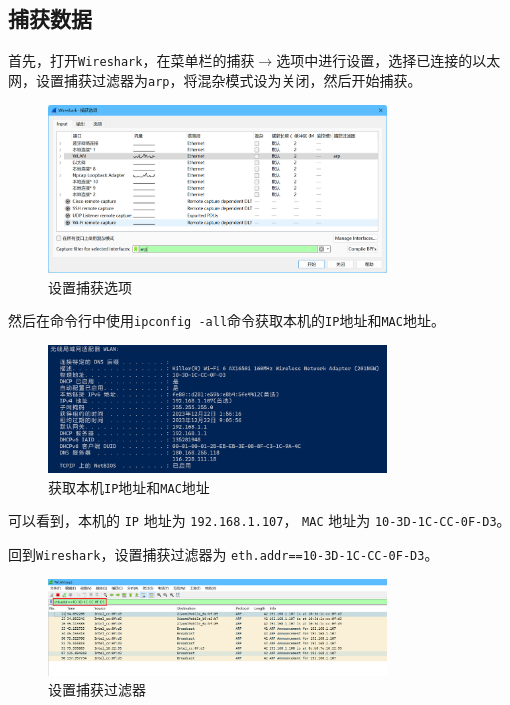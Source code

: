 \documentclass{article}
\begin{document}
\subsection{捕获数据}

首先，打开\texttt{Wireshark}，在菜单栏的捕获\(\to \)选项中进行设置，选择已连接的以太网，设置捕获过滤器为\texttt{arp}，将混杂模式设为关闭，然后开始捕获。

\begin{figure}[H]
  \centering
  \includegraphics[width=0.8\textwidth]{img/1.png}
  \caption{设置捕获选项}
  \label{fig:1}
\end{figure}

然后在命令行中使用\texttt{ipconfig -all}命令获取本机的\texttt{IP}地址和\texttt{MAC}地址。

\begin{figure}[H]
  \centering
  \includegraphics[width=0.8\textwidth]{img/2.png}
  \caption{获取本机\texttt{IP}地址和\texttt{MAC}地址}
  \label{fig:2}
\end{figure}

可以看到，本机的 \texttt{IP} 地址为 \texttt{192.168.1.107}， \texttt{MAC} 地址为 \texttt{10-3D-1C-CC-0F-D3}。

回到\texttt{Wireshark}，设置捕获过滤器为 \texttt{eth.addr==10-3D-1C-CC-0F-D3}。

\begin{figure}[H]
  \centering
  \includegraphics[width=0.8\textwidth]{img/3.png}
  \caption{设置捕获过滤器}
  \label{fig:3}
\end{figure}
\end{document}
